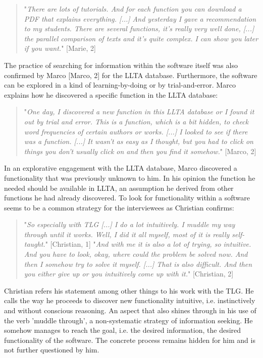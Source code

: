 \documentclass[12pt, a4paper, titlepage, oneside, abstract=true, toc=listof, toc=bibliography, BCOR=1cm]{scrreprt}
\begin{document}
{\begin{quotation}
"\textit{There are lots of tutorials. And for each function you can download a PDF that explains everything. [...] And yesterday I gave a recommendation to my students. There are several functions, it's really very well done, [...] the parallel comparison of texts and it's quite complex. I can show you later if you want.}" [Marie, 2]
\end{quotation}

The practice of searching for information within the software itself was also confirmed by Marco [Marco, 2] for the \gls{LLTA} database.
Furthermore, the software can be explored in a kind of learning-by-doing or by trial-and-error. Marco explains how he discovered a specific function in the LLTA database:

\begin{quotation}
"\textit{One day, I discovered a new function in this LLTA database or I found it out by trial and error. This is a function, which is a bit hidden, to check word frequencies of certain authors or works. [...] I looked to see if there was a function. [...] It wasn't as easy as I thought, but you had to click on things you don't usually click on and then you find it somehow.}" [Marco, 2]
\end{quotation}

In an explorative engagement with the LLTA database, Marco discovered a functionality that was previously unknown to him. In his opinion the function he needed should be available in LLTA, an assumption he derived from other functions he had already discovered. To look for functionality within a software seems to be a common strategy for the interviewees as Christian confirms:

\begin{quotation}
"\textit{So especially with TLG [...] I do a lot intuitively. I muddle my way through until it works. Well, I did it all myself, most of it is really self-taught.}" [Christian, 1]
"\textit{And with me it is also a lot of trying, so intuitive. And you have to look, okay, where could the problem be solved now. And then I somehow try to solve it myself. [...] That is also difficult. And then you either give up or you intuitively come up with it.}" [Christian, 2]
\end{quotation}

Christian refers his statement among other things to his work with the TLG. He calls the way he proceeds to discover new functionality intuitive, i.e. instinctively and without conscious reasoning. An aspect that also shines through in his use of the verb 'muddle through', a non-systematic strategy of information seeking. He somehow manages to reach the goal, i.e. the desired information, the desired functionality of the software. The concrete process remains hidden for him and is not further questioned by him.

}
\end{document}
